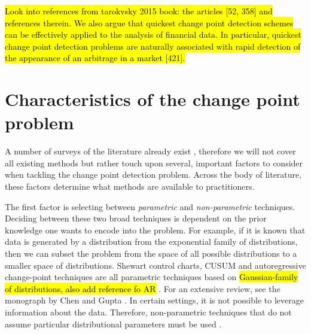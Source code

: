 \hl{Look into references from tarokvsky 2015 book:  the articles [52, 358] and references therein.
We also argue that quickest change point detection schemes can be effectively applied to the
analysis of financial data. In particular, quickest change point detection problems are naturally associated with rapid detection of the appearance of an arbitrage in a market [421].}

\section{Characteristics of the change point problem}
A number of surveys of the literature already exist \cite{aminikhanghahi2017survey}, therefore we will not cover all existing methods but rather touch upon several, important factors to consider when tackling the change point detection problem. Across the body of literature, these factors determine what methods are available to practitioners. %

The first factor is selecting between \textit{parametric} and \textit{non-parametric} techniques. Deciding between these two broad techniques is dependent on the prior knowledge one wants to encode into the problem. For example, if it is known that data is generated by a distribution from the exponential family of distributions, then we can subset the problem from the space of all possible distributions to a smaller space of distributions. Shewart control charts, CUSUM and autoregressive change-point techniques are all parametric techniques based on \hl{Gaussian-family of distributions, also add reference fo AR } \cite{page1954continuous}. For an extensive review, see the monograph by Chen and Gupta \cite{chen2011parametric}. In certain settings, it is not possible to leverage information about the data. Therefore, non-parametric techniques that do not assume particular distributional parameters must be used \cite{brodsky2013nonparametric}.%


